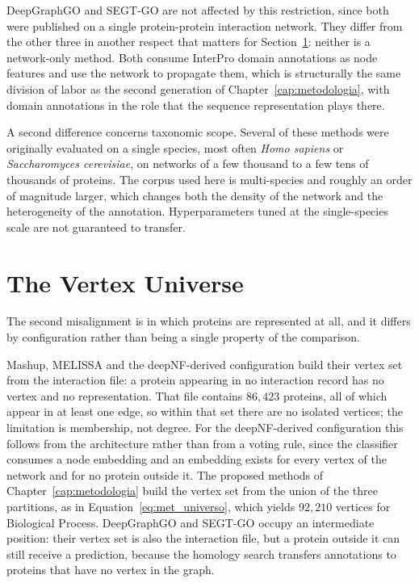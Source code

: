 \documentclass[Ingles]{ic-tese-v3}
\begin{document}
\begin{appendices}{}
DeepGraphGO and SEGT-GO are not affected by this restriction, since both were published on a single
protein-protein interaction network. They differ from the other three in another respect that matters
for Section~\ref{ape:universo}: neither is a network-only method. Both consume InterPro domain
annotations as node features and use the network to propagate them, which is structurally the same
division of labor as the second generation of Chapter~\ref{cap:metodologia}, with domain annotations
in the role that the sequence representation plays there.

A second difference concerns taxonomic scope. Several of these methods were originally evaluated on a
single species, most often \emph{Homo sapiens} or \emph{Saccharomyces cerevisiae}, on networks of a
few thousand to a few tens of thousands of proteins. The corpus used here is multi-species and
roughly an order of magnitude larger, which changes both the density of the network and the
heterogeneity of the annotation. Hyperparameters tuned at the single-species scale are not guaranteed
to transfer.

\section{The Vertex Universe}
\label{ape:universo}

The second misalignment is in which proteins are represented at all, and it differs by configuration
rather than being a single property of the comparison.

Mashup, MELISSA and the deepNF-derived configuration build their vertex set from the interaction
file: a protein appearing in no interaction record has no vertex and no representation. That file
contains $86{,}423$ proteins, all of which appear in at least one edge, so within that set there are
no isolated vertices; the limitation is membership, not degree. For the deepNF-derived configuration
this follows from the architecture rather than from a voting rule, since the classifier consumes a
node embedding and an embedding exists for every vertex of the network and for no protein outside
it. The proposed methods of
Chapter~\ref{cap:metodologia} build the vertex set from the union of the three partitions, as in
Equation~\eqref{eq:met_universo}, which yields $92{,}210$ vertices for Biological Process. DeepGraphGO
and SEGT-GO occupy an intermediate position: their vertex set is also the interaction file, but a
protein outside it can still receive a prediction, because the homology search transfers annotations
to proteins that have no vertex in the graph.


\end{appendices}
\end{document}
